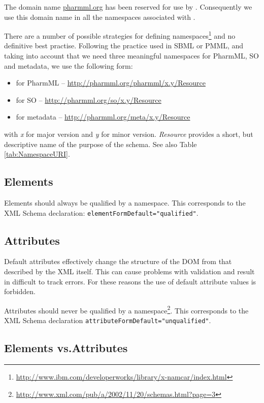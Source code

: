 The domain name \url{pharmml.org} has been reserved for use by
\pharmml. Consequently we use this domain name in all the namespaces
associated with \pharmml.

There are a number of possible strategies for defining
namespaces\footnote{\url{http://www.ibm.com/developerworks/library/x-namcar/index.html}}
and no definitive best practise. Following the practice used in SBML or PMML, 
and taking into account that we need three meaningful namespaces for 
PharmML, SO and metadata, we use the following form:
\begin{itemize}
\item
for PharmML -- \url{http://pharmml.org/pharmml/x.y/Resource}
\item
for SO -- \url{http://pharmml.org/so/x.y/Resource}
\item
for metadata -- \url{http://pharmml.org/meta/x.y/Resource}
\end{itemize}
with \emph{x} for major version and \emph{y} for minor version.
\emph{Resource} provides a short, but descriptive name of the purpose
of the schema. See also Table \ref{tab:NamespaceURI}.

\subsection{Elements}

Elements should always be qualified by a namespace. This corresponds
to the XML Schema declaration: \verb|elementFormDefault="qualified"|.

\subsection{Attributes}

Default attributes effectively change the structure of the DOM from
that described by the XML itself. This can cause problems with
validation and result in difficult to track errors. 
For these reasons the use of default attribute values is forbidden.

Attributes should never be qualified by a
namespace\footnote{\url{http://www.xml.com/pub/a/2002/11/20/schemas.html?page=3}}. This
corresponds to the XML Schema declaration
\verb|attributeFormDefault="unqualified"|.

\subsection{Elements vs.\@ Attributes}

